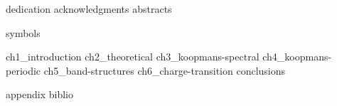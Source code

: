\documentclass[a4paper,11pt]{book}
\begin{document}
\setlength{\parindent}{0pt}
\setlength{\parskip}{0pt} %
\frontmatter


{dedication}
\setcounter{page}{0}
{acknowledgments}
{abstracts}

\cleardoublepage
{}
{\hypersetup{hidelinks} \tableofcontents}

\cleardoublepage
{}
{}
\listoffigures
 
\cleardoublepage
{}
{}
\listoftables

\cleardoublepage
{}
{symbols}

\setlength{\parskip}{1em}


\mainmatter
%
{ch1_introduction}
\cleardoublepage
%
{ch2_theoretical}
\cleardoublepage
%
{ch3_koopmans-spectral}
\cleardoublepage
%
{ch4_koopmans-periodic}
\cleardoublepage
%
{ch5_band-structures}
\cleardoublepage
%
{ch6_charge-transition}
\cleardoublepage
%
{conclusions}
\cleardoublepage

\cleardoublepage
{}


{appendix}
\backmatter
{biblio}
\end{document}
